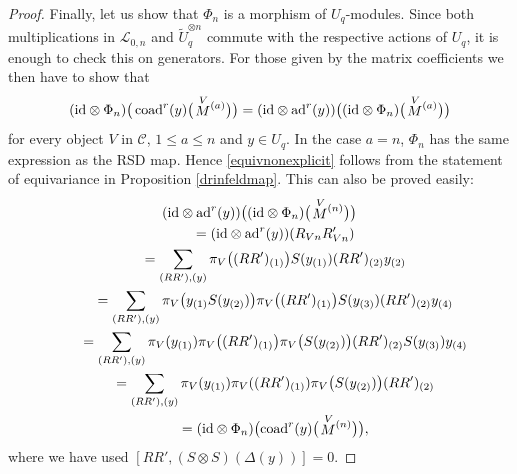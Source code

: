 \documentclass[pdftex]{sigma}%
\numberwithin{equation}{section}
\numberwithin{figure}{section}
\newcommand{\Ll}{{\mathcal L}}
\begin{document}
\begin{proof}
Finally, let us show that $\Phi_n$ is a morphism of $U_q$-modules. Since both multiplications in $\Ll_{0,n}$ and $\tilde U_q^{{\otimes} n}$ commute with the respective actions of $U_q$, it is enough to check this on generators. For those given by the matrix coefficients we then have to show that
\begin{equation}\label{equivnonexplicit}
({\rm id} \otimes \Phi_n)\big( \operatorname{coad}^r(y)\big(\!\stackrel{V}{M}{}^{\!\! (a)}\big) \big) = ({\rm id} \otimes \operatorname{ad}^r(y))\big(({\rm id} \otimes \Phi_n)\big(\!\stackrel{V}{M}{}^{\!\! (a)}\big)\big)
\end{equation}
for every object $V$ in $\mathcal{C}$, $1\leq a\leq n$ and $y\in U_q$. In the case $a=n$, $\Phi_n$ has the same expression as the RSD map. Hence \eqref{equivnonexplicit} follows from the statement of equivariance in Proposition \ref{drinfeldmap}.
This can also be proved easily:
\begin{gather*}
({\rm id} \otimes \operatorname{ad}^r(y))\big(({\rm id} \otimes \Phi_n) \big(\!\stackrel{V}{M}{}^{\!\! (n)}\big)\big)
\\ \qquad
{}=({\rm id} \otimes \operatorname{ad}^r(y))(R_{Vn}R_{Vn}')
\\ \qquad
{}=\sum_{(RR'),(y)}\pi_{V}\big((RR')_{(1)}\big)S(y_{(1)}) (RR')_{(2)}y_{(2)}
\\ \qquad
{}=\sum_{(RR'),(y)} \pi_{V}\big(y_{(1)}S(y_{(2)})\big) \pi_{V}\big((RR')_{(1)}\big)S(y_{(3)} )(RR')_{(2)}y_{(4)}
\\ \qquad
{}=\sum_{(RR'),(y)} \pi_{V}(y_{(1)})\pi_{V}\big((RR')_{(1)}\big)\pi_V\big(S(y_{(2)})\big) (RR')_{(2)}S(y_{(3)} )y_{(4)}
\\ \qquad
{}= \sum_{(RR'),(y)} \pi_{V}(y_{(1)})\pi_{V}((RR')_{(1)})\pi_V\big(S(y_{(2)})\big) (RR')_{(2)}
\\ \qquad
{}= ({\rm id} \otimes \Phi_n)\big(\! \operatorname{coad}^r(y)\big(\!\stackrel{V}{M}{}^{\!\! (n)}\big) \big),
\end{gather*}
where we have used $[RR', (S\otimes S)(\Delta(y))]=0.$


\end{proof}
\end{document}
